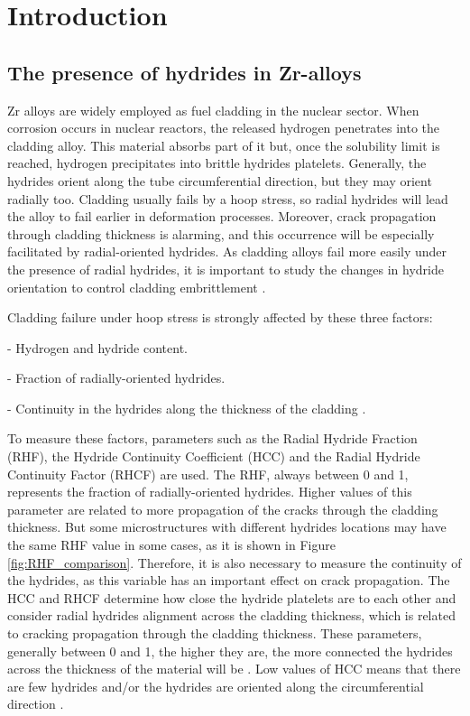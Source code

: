 \section{Introduction}

\subsection{The presence of hydrides in Zr-alloys}

\justify
\noindent
Zr alloys are widely employed as fuel cladding in the nuclear sector. When corrosion occurs in nuclear reactors, the released hydrogen penetrates into the cladding alloy. This material absorbs part of it but, once the solubility limit is reached, hydrogen precipitates into brittle hydrides platelets. Generally, the hydrides orient along the tube circumferential direction, but they may orient radially too. Cladding usually fails by a hoop stress, so radial hydrides will lead the alloy to fail earlier in deformation processes. Moreover, crack propagation through cladding thickness is alarming, and this occurrence will be especially facilitated by radial-oriented hydrides. As cladding alloys fail more easily under the presence of radial hydrides, it is important to study the changes in hydride orientation to control cladding embrittlement \cite{SIMON2021152817, COLAS2013586, SHARMA2018546, SUNIL}.

\noindent
Cladding failure under hoop stress is strongly  affected by these three factors:

\vspace{0.1 mm}
- Hydrogen and hydride content.

\vspace{0.1 mm}
- Fraction of radially-oriented hydrides.

\vspace{0.1 mm}
- Continuity in the hydrides along the thickness of the cladding \cite{SIMON2021152817}.

\noindent
To measure these factors, parameters such as the Radial Hydride Fraction (RHF), the Hydride Continuity Coefficient (HCC) and the Radial Hydride Continuity Factor (RHCF) are used. The RHF, always between 0 and 1, represents the fraction of radially-oriented hydrides. Higher values of this parameter are related to more propagation of the cracks through the cladding thickness. But some microstructures with different hydrides locations may have the same RHF value in some cases, as it is shown in Figure \ref{fig:RHF_comparison}. Therefore, it is also necessary to measure the continuity of the hydrides, as this variable has an important effect on crack propagation. The HCC and RHCF determine how close the hydride platelets are to each other and consider radial hydrides alignment across the cladding thickness, which is related to cracking propagation through the cladding thickness. These parameters, generally between 0 and 1, the higher they are, the more connected the hydrides across the thickness of the material will be \cite{SIMON2021152817}. Low values of HCC means that there are few hydrides and/or the hydrides are oriented along the circumferential direction \cite{SHARMA2018546}.

